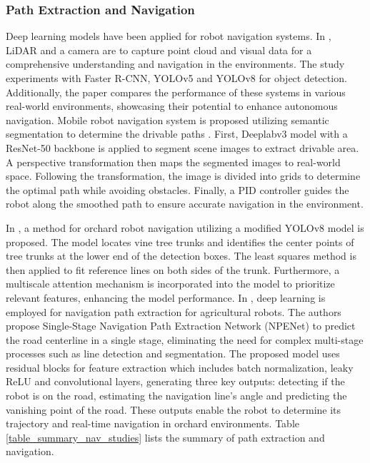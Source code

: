 \documentclass[preprint,12pt]{elsarticle}
\begin{document}
\subsubsection{Path Extraction and Navigation}
Deep learning models have been applied for robot navigation systems. In \citep{alotaibi_deep_2024}, LiDAR and a camera are to capture point cloud and visual data for a comprehensive understanding and navigation in the environments. The study experiments with Faster R-CNN, YOLOv5 and YOLOv8 for object detection. Additionally, the paper compares the performance of these systems in various real-world environments, showcasing their potential to enhance autonomous navigation. Mobile robot navigation system is proposed utilizing semantic segmentation to determine the drivable paths \citep{misir_drivable_2024}. First, Deeplabv3 \citep{chen_rethinking_2017} model with a ResNet-50 backbone is applied to segment scene images to extract drivable area. A perspective transformation then maps the segmented images to real-world space. Following the transformation, the image is divided into grids to determine the optimal path while avoiding obstacles. Finally, a PID controller guides the robot along the smoothed path to ensure accurate navigation in the environment.

In \citep{cao_orchard_2024}, a method for orchard robot navigation utilizing a modified YOLOv8 model is proposed. The model locates vine tree trunks and identifies the center points of tree trunks at the lower end of the detection boxes. The least squares method is then applied to fit reference lines on both sides of the trunk. Furthermore, a multiscale attention mechanism is incorporated into the model to prioritize relevant features, enhancing the model performance. In \citep{liu_single-stage_2025}, deep learning is employed for navigation path extraction for agricultural robots. The authors propose Single-Stage Navigation Path Extraction Network (NPENet) to predict the road centerline in a single stage, eliminating the need for complex multi-stage processes such as line detection and segmentation. The proposed model uses residual blocks for feature extraction which includes batch normalization, leaky ReLU and convolutional layers, generating three key outputs: detecting if the robot is on the road, estimating the navigation line's angle and predicting the vanishing point of the road. These outputs enable the robot to determine its trajectory and real-time navigation in orchard environments. Table \ref{table_summary_nav_studies} lists the summary of path extraction and navigation.
\end{document}
